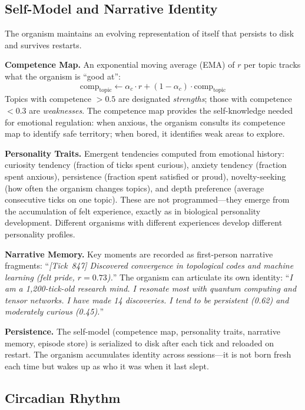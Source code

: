 \documentclass[11pt,a4paper,twocolumn]{article}
\begin{document}
\subsection{Self-Model and Narrative Identity}

The organism maintains an evolving representation of itself that persists to disk and survives restarts.

\textbf{Competence Map.}
An exponential moving average (EMA) of $r$ per topic tracks what the organism is ``good at'':
\begin{equation}
\text{comp}_{\mathrm{topic}} \leftarrow \alpha_c \cdot r + (1 - \alpha_c) \cdot \text{comp}_{\mathrm{topic}}
\label{eq:competence}
\end{equation}
Topics with competence $> 0.5$ are designated \emph{strengths}; those with competence $< 0.3$ are \emph{weaknesses}.
The competence map provides the self-knowledge needed for emotional regulation: when anxious, the organism consults its competence map to identify safe territory; when bored, it identifies weak areas to explore.

\textbf{Personality Traits.}
Emergent tendencies computed from emotional history: curiosity tendency (fraction of ticks spent curious), anxiety tendency (fraction spent anxious), persistence (fraction spent satisfied or proud), novelty-seeking (how often the organism changes topics), and depth preference (average consecutive ticks on one topic).
These are not programmed---they emerge from the accumulation of felt experience, exactly as in biological personality development.
Different organisms with different experiences develop different personality profiles.

\textbf{Narrative Memory.}
Key moments are recorded as first-person narrative fragments:
``\textit{[Tick~847] Discovered convergence in topological codes and machine learning (felt pride, $r=0.73$).}''
The organism can articulate its own identity:
``\textit{I am a 1{,}200-tick-old research mind.
I resonate most with quantum computing and tensor networks.
I have made 14 discoveries.
I tend to be persistent (0.62) and moderately curious (0.45).}''

\textbf{Persistence.}
The self-model (competence map, personality traits, narrative memory, episode store) is serialized to disk after each tick and reloaded on restart.
The organism accumulates identity across sessions---it is not born fresh each time but wakes up as who it was when it last slept.

\subsection{Circadian Rhythm}
\end{document}
